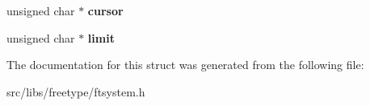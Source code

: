 \begin{DoxyCompactItemize}
\item 
\hypertarget{struct_f_t___stream_rec___ab7dbbad87d8b6d0178771a06e1ce8b4d}{
unsigned char $\ast$ {\bfseries cursor}}
\label{struct_f_t___stream_rec___ab7dbbad87d8b6d0178771a06e1ce8b4d}

\item 
\hypertarget{struct_f_t___stream_rec___aff006e6ee3bbc2741a2c4ae79b1bad3a}{
unsigned char $\ast$ {\bfseries limit}}
\label{struct_f_t___stream_rec___aff006e6ee3bbc2741a2c4ae79b1bad3a}

\end{DoxyCompactItemize}


The documentation for this struct was generated from the following file:\begin{DoxyCompactItemize}
\item 
src/libs/freetype/ftsystem.h\end{DoxyCompactItemize}
